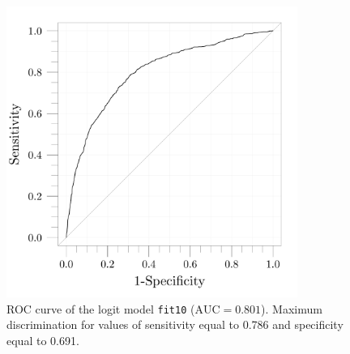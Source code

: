 
\begin{figure}[H]
\center
\includegraphics[width=9.5cm,height=9.5cm]{images/ROC_curve.pdf}
\caption[ROC curve of the selected GLM]{ROC curve of the logit model \texttt{fit10} ($\text{AUC}=0.801$). Maximum discrimination for values of sensitivity equal to 0.786 and specificity equal to 0.691.}
\label{fig:roc_curve}
\end{figure}

